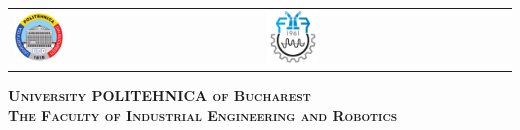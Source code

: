 



\begin{titlepage}
	\centering
	\begin{tabular}{p{6cm}p{3.2cm}}
		\includegraphics[width=0.2\textwidth]{img/upb.png} &
		\includegraphics[width=0.22\textwidth]{img/fiir.png}
	\end{tabular}
	\vspace{1cm}

	{\scshape\Large \textbf{University POLITEHNICA of Bucharest} \\}
	{\scshape\Large \textbf{The Faculty of Industrial Engineering and Robotics} \\}
	
\end{titlepage}


